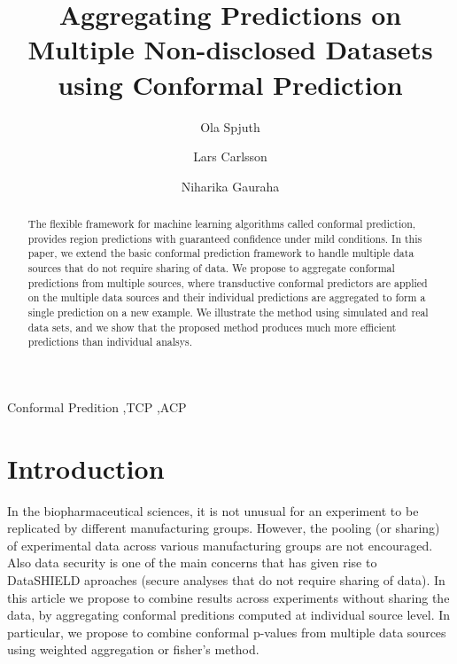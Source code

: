 \documentclass[main]{subfiles}
\begin{document}
\begin{frontmatter}

\title{Aggregating Predictions on Multiple Non-disclosed Datasets using Conformal Prediction}

\author[label1]{Ola Spjuth}
\author[label2]{Lars Carlsson}
\author[label1]{Niharika Gauraha}


\address[label1]{Uppsala University}
\address[label2]{AstraZeneca}

\begin{abstract}
The flexible framework for machine learning algorithms called conformal prediction, provides region predictions with guaranteed confidence under mild conditions. %
In this paper, we extend the basic conformal prediction framework to handle %
multiple data sources that do not require sharing of data.
We propose to aggregate conformal predictions from multiple sources, where transductive conformal predictors are applied on the multiple data sources and their individual predictions are aggregated to form a single prediction on a new example. We illustrate the method using simulated and real data sets, and we show that the proposed method produces much more efficient predictions than individual analsys.
\end{abstract}
\begin{keyword}


Conformal Predition \sep TCP   \sep ACP
\end{keyword}

\end{frontmatter}

\section{Introduction}
In the biopharmaceutical sciences, it is not unusual for an experiment to be replicated by different manufacturing groups. However, the pooling (or sharing) of experimental data across various manufacturing groups are not encouraged. Also data security is  one of the main concerns that has given rise to DataSHIELD aproaches (secure analyses that do not require sharing of data). 
In this article we propose to combine results across experiments without sharing the data, by aggregating conformal preditions computed at individual source level.  In particular, we propose to combine conformal p-values from multiple data sources using weighted aggregation or fisher's method. 
\end{document}
